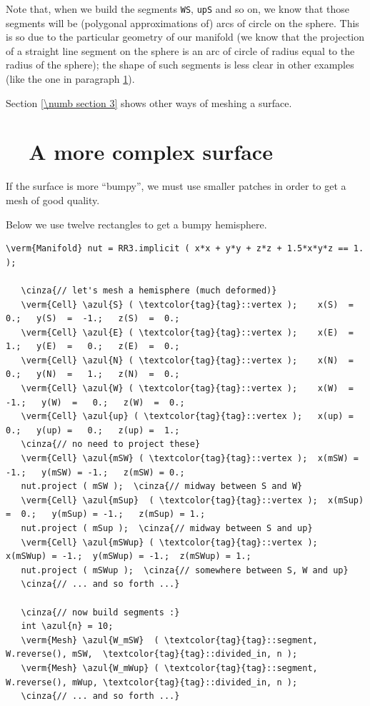 Note that, when we build the segments {\small\tt WS}, {\small\tt upS} and so on,
we know that those segments will be (polygonal approximations of) arcs of circle on the sphere.
This is so due to the particular geometry of our manifold (we know that the projection of
a straight line segment on the sphere is an arc of circle of radius equal to the radius of
the sphere); the shape of such segments is less clear in other examples
(like the one in paragraph \ref{\numb section 2.\numb parag 7}).

Section \ref{\numb section 3} shows other ways of meshing a surface.


\section{~~A more complex surface}\label{\numb section 2.\numb parag 7}

If the surface is more ``bumpy'',
we must use smaller patches in order to get a mesh of good quality.

Below we use twelve rectangles to get a bumpy hemisphere.

\begin{Verbatim}[commandchars=\\\{\},formatcom=\small\tt,frame=single,
   label=parag-\ref{\numb section 2.\numb parag 7}.cpp,rulecolor=\color{coment},
   baselinestretch=0.94,framesep=2mm]
   \verm{Manifold} nut = RR3.implicit ( x*x + y*y + z*z + 1.5*x*y*z == 1. );

   \cinza{// let's mesh a hemisphere (much deformed)}
   \verm{Cell} \azul{S} ( \textcolor{tag}{tag}::vertex );    x(S)  =   0.;   y(S)  =  -1.;   z(S)  =  0.;
   \verm{Cell} \azul{E} ( \textcolor{tag}{tag}::vertex );    x(E)  =   1.;   y(E)  =   0.;   z(E)  =  0.;
   \verm{Cell} \azul{N} ( \textcolor{tag}{tag}::vertex );    x(N)  =   0.;   y(N)  =   1.;   z(N)  =  0.;
   \verm{Cell} \azul{W} ( \textcolor{tag}{tag}::vertex );    x(W)  =  -1.;   y(W)  =   0.;   z(W)  =  0.;
   \verm{Cell} \azul{up} ( \textcolor{tag}{tag}::vertex );   x(up) =   0.;   y(up) =   0.;   z(up) =  1.;
   \cinza{// no need to project these}
   \verm{Cell} \azul{mSW} ( \textcolor{tag}{tag}::vertex );  x(mSW) = -1.;   y(mSW) = -1.;   z(mSW) = 0.;
   nut.project ( mSW );  \cinza{// midway between S and W}
   \verm{Cell} \azul{mSup}  ( \textcolor{tag}{tag}::vertex );  x(mSup) =  0.;   y(mSup) = -1.;   z(mSup) = 1.;
   nut.project ( mSup );  \cinza{// midway between S and up}
   \verm{Cell} \azul{mSWup} ( \textcolor{tag}{tag}::vertex );  x(mSWup) = -1.;  y(mSWup) = -1.;  z(mSWup) = 1.;
   nut.project ( mSWup );  \cinza{// somewhere between S, W and up}
   \cinza{// ... and so forth ...}

   \cinza{// now build segments :}
   int \azul{n} = 10;
   \verm{Mesh} \azul{W_mSW}  ( \textcolor{tag}{tag}::segment, W.reverse(), mSW,  \textcolor{tag}{tag}::divided_in, n );
   \verm{Mesh} \azul{W_mWup} ( \textcolor{tag}{tag}::segment, W.reverse(), mWup, \textcolor{tag}{tag}::divided_in, n );
   \cinza{// ... and so forth ...}
\end{Verbatim}

